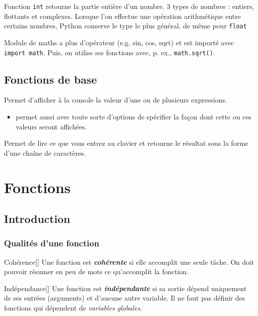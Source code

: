 \documentclass[10pt, french]{article}
\begin{document}
\begin{multicols*}{2}
Fonction \texttt{int} retourne la partie entière d'un nombre.
3 types de nombres : entiers, flottants et complexes. Lorsque l'on effectue une opération arithmétique entre certains nombres, Python conserve le type le plus général.
	de même pour \texttt{float}
	
Module de maths a plus d'opérateur (e.g. sin, cos, sqrt) et est importé avec \texttt{import math}. Puis, on utilise ses fonctions avec, p. ex., \texttt{math.sqrt()}.


\subsection{Fonctions de base}
\begin{definitionNOHFILLsub}
Permet d'afficher à la console la valeur d'une ou de plusieurs expressions.
\begin{itemize}
	\item	permet aussi avec toute sorte d'options de spécifier la façon dont cette ou ces valeurs seront affichées.
\end{itemize}
\end{definitionNOHFILLsub}

\begin{definitionNOHFILLsub}
Permet de lire ce que vous entrez au clavier et retourne le résultat sous la forme d'une chaîne de caractères.

\end{definitionNOHFILLsub}



\newpage
\section{Fonctions}
\subsection{Introduction}
\subsubsection{Qualités d'une fonction}
\begin{definitionGENERAL}{Cohérence}[]
Une fonction est \textbf{\textit{cohérente}} si elle accomplit une seule tâche. On doit pouvoir résumer en peu de mots ce qu'accomplit la fonction.
\end{definitionGENERAL}

\begin{definitionGENERAL}{Indépendance}[]
Une fonction est \textbf{\textit{indépendante}} si sa sortie dépend uniquement de ses entrées (arguments) et d'aucune autre variable. Il ne faut pas définir des fonctions qui dépendent de \textit{variables globales}.
\end{definitionGENERAL}


\end{multicols*}
\end{document}
